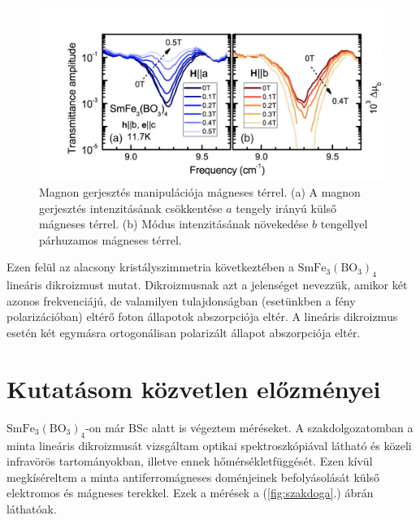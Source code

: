 \documentclass[a4paper,12pt]{article}
\numberwithin{equation}{section}
\begin{document}
\begin{figure}[H]
\begin{center}
\includegraphics[width=10 cm]{Dávidék mérései/magnonmanipulationB.png}
\end{center}
\caption{Magnon gerjesztés manipulációja mágneses térrel. 
(a) A magnon gerjesztés intenzitásának csökkentése $a$ tengely irányú külső mágneses térrel. (b) Módus intenzitásának növekedése $b$ tengellyel párhuzamos mágneses térrel.
\cite{2018_PRL} }

\label{fig:magnonB}
\end{figure}

Ezen felül az alacsony kristályszimmetria következtében a ${\mathrm{SmFe_3(BO_3)_4}}$ lineáris dikroizmust mutat. Dikroizmusnak azt a jelenséget nevezzük, amikor két azonos frekvenciájú, de valamilyen tulajdonságban (esetünkben a fény polarizációban) eltérő foton állapotok abszorpciója eltér. A lineáris dikroizmus esetén két egymásra ortogonálisan polarizált állapot abszorpciója eltér.

\newpage

\section{Kutatásom közvetlen előzményei}

${\mathrm{SmFe_3(BO_3)_4}}$-on már BSc alatt is végeztem méréseket. A szakdolgozatomban a minta lineáris dikroizmusát vizsgáltam optikai spektroszkópiával látható és közeli infravörös tartományokban, illetve ennek hőmérsékletfüggését. Ezen kívül megkíséreltem a minta antiferromágneses doménjeinek befolyásolását külső elektromos és mágneses terekkel. Ezek a mérések a (\ref{fig:szakdoga}.) ábrán láthatóak.
\end{document}

